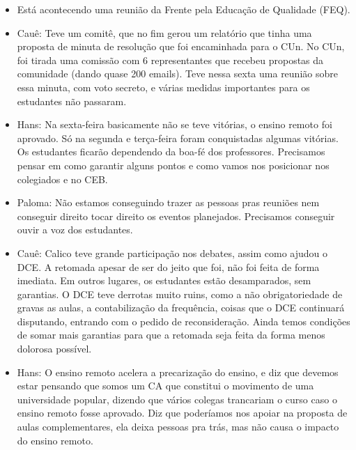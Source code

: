 \documentclass{ata-calico}
\begin{document}
\maketitle

\begin{itemize}
\item Está acontecendo uma reunião da Frente pela Educação de Qualidade (FEQ).
\end{itemize}

\begin{itemize}
\item Cauê: Teve um comitê, que no fim gerou um relatório que tinha uma proposta de minuta de resolução que foi encaminhada para o CUn. No CUn, foi tirada uma comissão com 6 representantes que recebeu propostas da comunidade (dando quase 200 emails). Teve nessa sexta uma reunião sobre essa minuta, com voto secreto, e várias medidas importantes para os estudantes não passaram.
\item Hans: Na sexta-feira basicamente não se teve vitórias, o ensino remoto foi aprovado. Só na segunda e terça-feira foram conquistadas algumas vitórias. Os estudantes ficarão dependendo da boa-fé dos professores. Precisamos pensar em como garantir alguns pontos e como vamos nos posicionar nos colegiados e no CEB.
\item Paloma: Não estamos conseguindo trazer as pessoas pras reuniões nem conseguir direito tocar direito os eventos planejados. Precisamos conseguir ouvir a voz dos estudantes.
\item Cauê: Calico teve grande participação nos debates, assim como ajudou o DCE. A retomada apesar de ser do jeito que foi, não foi feita de forma imediata. Em outros lugares, os estudantes estão desamparados, sem garantias. O DCE teve derrotas muito ruins, como a não obrigatoriedade de gravas as aulas, a contabilização da frequência, coisas que o DCE continuará disputando, entrando com o pedido de reconsideração. Ainda temos condições de somar mais garantias para que a retomada seja feita da forma menos dolorosa possível.
\item Hans: O ensino remoto acelera a precarização do ensino, e diz que devemos estar pensando que somos um CA que constitui o movimento de uma universidade popular, dizendo que vários colegas trancariam o curso caso o ensino remoto fosse aprovado. Diz que poderíamos nos apoiar na proposta de aulas complementares, ela deixa pessoas pra trás, mas não causa o impacto do ensino remoto.

\end{itemize}
\end{document}
